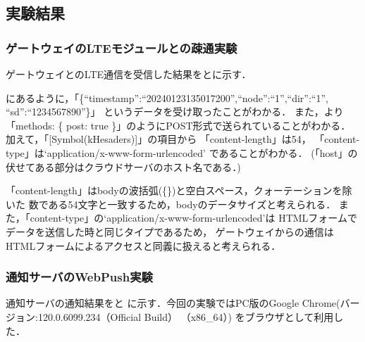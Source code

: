 \documentclass[12pt]{honka_v1}
\begin{document}
\subsection{実験結果}
\subsubsection{ゲートウェイのLTEモジュールとの疎通実験}
ゲートウェイとのLTE通信を受信した結果をとに示す．


にあるように，「\{``timestamp'':``20240123135017200'',``node'':``1'',``dir'':``1'',\\
``sd'':``1234567890''\}」
というデータを受け取ったことがわかる．
また，より
「methods: \{ post: true \}」のようにPOST形式で送られていることがわかる．
加えて，「[Symbol(kHesaders)]」の項目から
「content-length」は54，
「content-type」は`application/x-www-form-urlencoded'
であることがわかる．
(「host」の伏せてある部分はクラウドサーバのホスト名である．)

「content-length」はbodyの波括弧(\{\})と空白スペース，クォーテーションを除いた
数である54文字と一致するため，bodyのデータサイズと考えられる．
また，「content-type」の`application/x-www-form-urlencoded'は
HTMLフォームでデータを送信した時と同じタイプであるため\cite{bib:postform-web}，
ゲートウェイからの通信はHTMLフォームによるアクセスと同義に扱えると考えられる．

\subsubsection{通知サーバのWebPush実験}
通知サーバの通知結果をと
に示す．今回の実験ではPC版のGoogle Chrome(バージョン:120.0.6099.234（Official Build） （x86\_64）)
をブラウザとして利用した．

\end{document}
